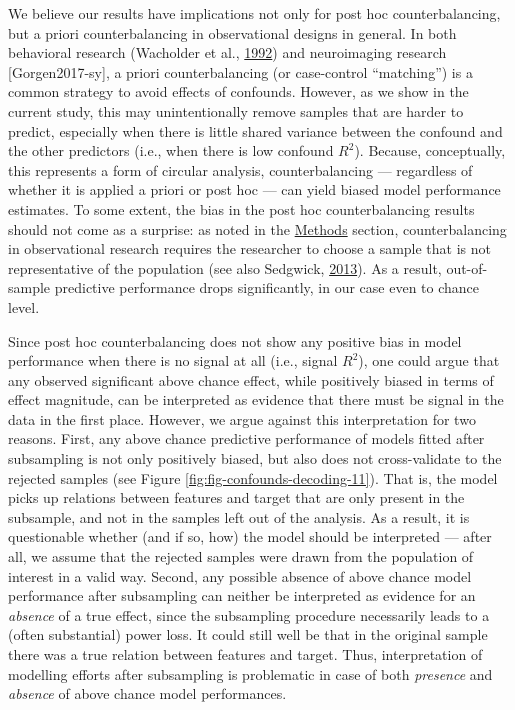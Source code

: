 \documentclass[11pt,american,a4paper,oneside,]{memoir} %
\begin{document}
We believe our results have implications not only for post hoc counterbalancing, but a priori counterbalancing in observational designs in general. In both behavioral research (Wacholder et al., \protect\hyperlink{ref-Wacholder1992-wb}{1992}) and neuroimaging research {[}Gorgen2017-sy{]}, a priori counterbalancing (or case-control ``matching'') is a common strategy to avoid effects of confounds. However, as we show in the current study, this may unintentionally remove samples that are harder to predict, especially when there is little shared variance between the confound and the other predictors (i.e., when there is low confound \(R^2\)). Because, conceptually, this represents a form of circular analysis, counterbalancing --- regardless of whether it is applied a priori or post hoc --- can yield biased model performance estimates. To some extent, the bias in the post hoc counterbalancing results should not come as a surprise: as noted in the \protect\hyperlink{confounds-decoding-methods}{Methods} section, counterbalancing in observational research requires the researcher to choose a sample that is not representative of the population (see also Sedgwick, \protect\hyperlink{ref-Sedgwick2013-op}{2013}). As a result, out-of-sample predictive performance drops significantly, in our case even to chance level.

Since post hoc counterbalancing does not show any positive bias in model performance when there is no signal at all (i.e., signal \(R^2\)), one could argue that any observed significant above chance effect, while positively biased in terms of effect magnitude, can be interpreted as evidence that there must be signal in the data in the first place. However, we argue against this interpretation for two reasons. First, any above chance predictive performance of models fitted after subsampling is not only positively biased, but also does not cross-validate to the rejected samples (see Figure \ref{fig:fig-confounds-decoding-11}). That is, the model picks up relations between features and target that are only present in the subsample, and not in the samples left out of the analysis. As a result, it is questionable whether (and if so, how) the model should be interpreted --- after all, we assume that the rejected samples were drawn from the population of interest in a valid way. Second, any possible absence of above chance model performance after subsampling can neither be interpreted as evidence for an \emph{absence} of a true effect, since the subsampling procedure necessarily leads to a (often substantial) power loss. It could still well be that in the original sample there was a true relation between features and target. Thus, interpretation of modelling efforts after subsampling is problematic in case of both \emph{presence} and \emph{absence} of above chance model performances.
\end{document}
